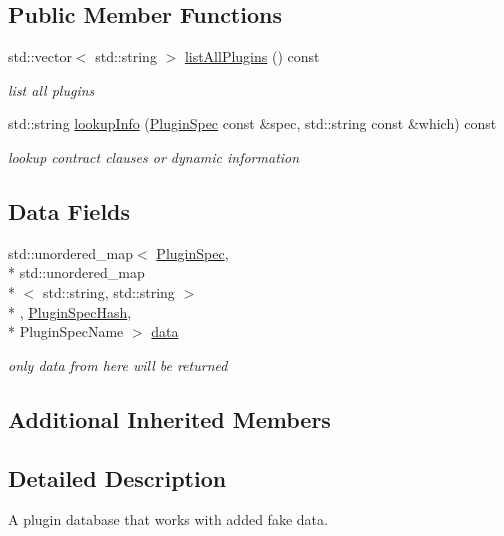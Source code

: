 \subsection*{Public Member Functions}
\begin{DoxyCompactItemize}
\item 
std\+::vector$<$ std\+::string $>$ \hyperlink{classkdb_1_1tools_1_1MockPluginDatabase_afb3aef79c6e8447f2555dae303ce1893}{list\+All\+Plugins} () const 
\begin{DoxyCompactList}\small\item\em list all plugins \end{DoxyCompactList}\item 
std\+::string \hyperlink{classkdb_1_1tools_1_1MockPluginDatabase_af1e8fa2f1ff8a1c5ac7005dd65101e93}{lookup\+Info} (\hyperlink{classkdb_1_1tools_1_1PluginSpec}{Plugin\+Spec} const \&spec, std\+::string const \&which) const 
\begin{DoxyCompactList}\small\item\em lookup contract clauses or dynamic information \end{DoxyCompactList}\end{DoxyCompactItemize}
\subsection*{Data Fields}
\begin{DoxyCompactItemize}
\item 
std\+::unordered\+\_\+map$<$ \hyperlink{classkdb_1_1tools_1_1PluginSpec}{Plugin\+Spec}, \\*
std\+::unordered\+\_\+map\\*
$<$ std\+::string, std\+::string $>$\\*
, \hyperlink{structkdb_1_1tools_1_1PluginSpecHash}{Plugin\+Spec\+Hash}, \\*
Plugin\+Spec\+Name $>$ \hyperlink{classkdb_1_1tools_1_1MockPluginDatabase_ada123c0b3f854802195670ec7d908fc1}{data}
\begin{DoxyCompactList}\small\item\em only data from here will be returned \end{DoxyCompactList}\end{DoxyCompactItemize}
\subsection*{Additional Inherited Members}


\subsection{Detailed Description}
A plugin database that works with added fake data. 


